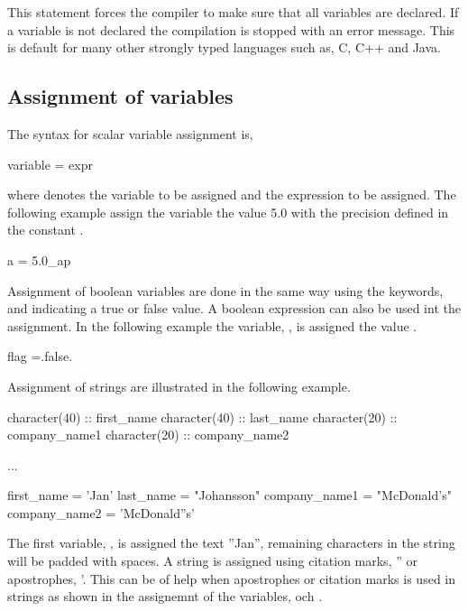 This statement forces the compiler to make sure that all variables are declared. If a variable is not declared the compilation is stopped with an error message. This is default for many other strongly typed languages such as, C, C++ and Java.

\subsection{Assignment of variables}

The syntax for scalar variable assignment is, 

\begin{fsyntax}
variable = expr
\end{fsyntax}

where  denotes the variable to be assigned and  the expression to be assigned. The following example assign the  variable the value 5.0 with the precision defined in the constant .

\begin{fortrancodeenv}
a = 5.0_ap
\end{fortrancodeenv}

Assignment of boolean variables are done in the same way using the keywords,  and  indicating a true or false value. A boolean expression can also be used int the assignment. In the following example the variable, , is assigned the value .

\begin{fortrancodeenv}
flag =.false.
\end{fortrancodeenv}

Assignment of strings are illustrated in the following example. 

\begin{fortrancodeenv}
character(40) :: first_name
character(40) :: last_name
character(20) :: company_name1
character(20) :: company_name2

...

first_name = 'Jan'
last_name = "Johansson"
company_name1 = "McDonald's"
company_name2 = 'McDonald''s'
\end{fortrancodeenv}

The first variable, , is assigned the text ''Jan'', remaining characters in the string will be padded with spaces. A string is assigned using citation marks, '' or apostrophes, '. This can be of help when apostrophes or citation marks is used in strings as shown in the assignemnt of the variables,  och .


